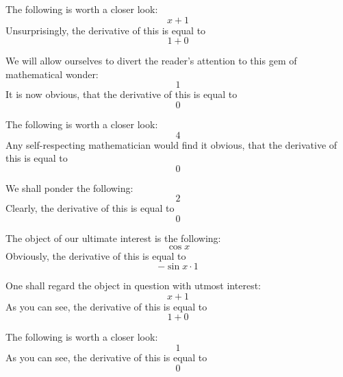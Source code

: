 \documentclass{article}
\begin{document}
The following is worth a closer look:
\begin{equation}
x + 1 
\end{equation}
Unsurprisingly, the derivative of this is equal to
\begin{equation}
1 + 0 
\end{equation}

We will allow ourselves to divert the reader's attention to this gem of mathematical wonder:
\begin{equation}
1 
\end{equation}
It is now obvious, that the derivative of this is equal to
\begin{equation}
0 
\end{equation}

The following is worth a closer look:
\begin{equation}
4 
\end{equation}
Any self-respecting mathematician would find it obvious, that the derivative of this is equal to
\begin{equation}
0 
\end{equation}

We shall ponder the following:
\begin{equation}
2 
\end{equation}
Clearly, the derivative of this is equal to
\begin{equation}
0 
\end{equation}

The object of our ultimate interest is the following:
\begin{equation}
\cos x 
\end{equation}
Obviously, the derivative of this is equal to
\begin{equation}
-\sin x \cdot 1 
\end{equation}

One shall regard the object in question with utmost interest:
\begin{equation}
x + 1 
\end{equation}
As you can see, the derivative of this is equal to
\begin{equation}
1 + 0 
\end{equation}

The following is worth a closer look:
\begin{equation}
1 
\end{equation}
As you can see, the derivative of this is equal to
\begin{equation}
0 
\end{equation}
\end{document}
